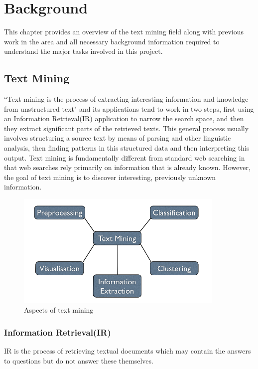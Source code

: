 \chapter{Background}
\label{cha:background}
This chapter provides an overview of the text mining field along with previous work in the area and all necessary background information required to understand the major tasks involved in this project.

\section{Text Mining}
\label{sec:textmining}
``Text mining is the process of extracting interesting information and knowledge from unstructured text"\cite{hotho-etal-ldv-2005} and its applications tend to work in two steps, first using an Information Retrieval(IR) application to narrow the search space, and then they extract significant parts of the retrieved texts\cite{Polajnar2006}. This general process usually involves structuring a source text by means of parsing and other linguistic analysis, then finding patterns in this structured data and then interpreting this output. Text mining is fundamentally different from standard web searching in that web searches rely primarily on information that is already known. However, the goal of text mining is to discover interesting, previously unknown information\cite{Gupta_Lehal_2009}. 
\begin{figure}
\begin{center}
\includegraphics[width=10cm]{textmining}
\end{center}
\caption{Aspects of text mining}
\label{fig:tm}
\end{figure}


\subsection[Information Retrieval]{Information Retrieval(IR)}
IR is the process of retrieving textual documents which may contain the answers to questions but do not answer these themselves\cite{hotho-etal-ldv-2005}.


